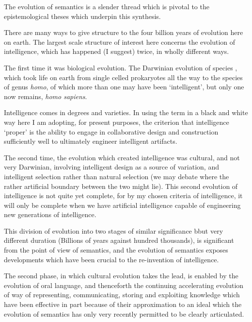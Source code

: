 The evolution of semantics is a slender thread which is pivotal to the epistemological theses which underpin this synthesis.

There are many ways to give structure to the four billion years of evolution here on earth.
The largest scale structure of interest here concerns the evolution of intelligence, which has happened (I suggest) twice, in wholly different ways.

The first time it was biological evolution.
The Darwinian evolution of species \cite{darwin-oos}, which took life on earth from single celled prokaryotes all the way to the species of genus \emph{homo}, of which more than one may have been `intelligent', but only one now remains, \emph{homo sapiens}.

Intelligence comes in degrees and varieties.
In using the term in a black and white way here I am adopting, for present purposes, the criterion that intelligence `proper' is the ability to engage in collaborative design and construction sufficiently well to ultimately engineer intelligent artifacts.

The second time, the evolution which created intelligence was cultural, and not very Darwinian, involving intelligent design as a source of variation, and intelligent selection rather than natural selection (we may debate where the rather artificial boundary between the two might lie).
This second evolution of intelligence is not quite yet complete, for by my chosen criteria of intelligence, it will only be complete when we have artificial intelligence capable of engineering new generations of intelligence.

This division of evolution into two stages of similar significance bbut very different duration (Billions of years against hundred thousands), is significant from the point of view of semantics, and the evolution of semantics exposes developments which have been crucial to the re-invention of intelligence.

The second phase, in which cultural evolution takes the lead, is enabled by the evolution of oral language, and thenceforth the continuing accelerating evolution of way of representing, communicating, storing and exploiting knowledge which have been effective in part because of their approximation to an ideal which the evolution of semantics has only very recently permitted to be clearly articulated.


